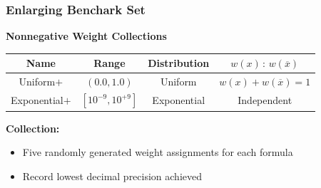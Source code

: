 \documentclass[t,pdf]{beamer}
\newcommand{\obar}[1]{\overline{#1}}
\newcommand{\bitem}{\item[$\bullet$]}
\begin{document}
\begin{frame}
  \frametitle{Enlarging Benchark Set}

% 

\bigskip

  \textbf{Nonnegative Weight Collections}

 \begin{center}
   \begin{tabular}{cccc}
     Name & Range & Distribution & $w(x)\,:\,w(\obar{x})$ \\
     \midrule
     Uniform$+$      & $(0.0, 1.0)$         & Uniform     & $w(x) + w(\obar{x}) = 1$ \\[0.5em]
     Exponential$+$ & $[10^{-9}, 10^{+9}]$ & Exponential & Independent \\
   \end{tabular}
 \end{center}

\bigskip

\textbf{Collection:}

  \begin{itemize}
    \item Five randomly generated weight assignments for each formula
    \item Record lowest decimal precision achieved
  \end{itemize}

\end{frame}
\end{document}
